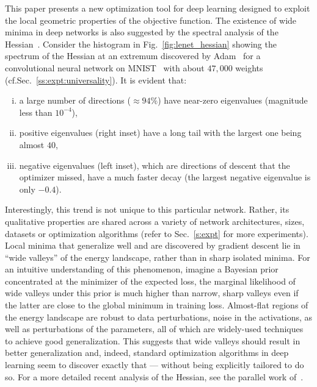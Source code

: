 \documentclass[10pt]{article}
\newcommand{\todo}[1]{{\color{gray}#1}\marginpar{\tiny\noindent{\raggedright{\color{blue}[TODO]}}}}
\begin{document}
This paper presents a new optimization tool for deep learning designed to exploit the local geometric properties of the objective function. \todo{The existence of wide minima in deep networks is also suggested by the spectral analysis of the Hessian~\citep{sagun2016singularity}.} Consider the histogram in Fig.~\ref{fig:lenet_hessian} showing the spectrum of the Hessian at an extremum discovered by Adam~\citep{kingma2014adam} for a convolutional neural network on MNIST~\citep{lecun1998gradient} with about $47,000$ weights (cf.\@ Sec.~\ref{ss:expt:universality}). It is evident that:
\begin{enumerate}[(i)]
\item a large number of directions ($\approx 94\%$) have near-zero eigenvalues (magnitude less than $10^{-4}$),
\item positive eigenvalues (right inset) have a long tail with the largest one being almost $40$,
\item negative eigenvalues (left inset), which are directions of descent that the optimizer missed, have a much faster decay (the largest negative eigenvalue is only $-0.4$).
\end{enumerate}
Interestingly, this trend is not unique to this particular network. Rather, its qualitative properties are shared across a variety of network architectures, sizes, datasets or optimization algorithms (refer to Sec.~\ref{s:expt} for more experiments). Local minima that generalize well and are discovered by gradient descent lie in ``wide valleys'' of the energy landscape, rather than in sharp isolated minima. For an intuitive understanding of this phenomenon, imagine a Bayesian prior concentrated at the minimizer of the expected loss, the marginal likelihood of wide valleys under this prior is much higher than narrow, sharp valleys even if the latter are close to the global minimum in training loss. Almost-flat regions of the energy landscape are robust to data perturbations, noise in the activations, as well as perturbations of the parameters, all of which are widely-used techniques to achieve good generalization. This suggests that wide valleys should result in better generalization and, indeed, standard optimization algorithms in deep learning seem to discover exactly that --- without being explicitly tailored to do so. \todo{For a more detailed recent
analysis of the Hessian, see the parallel work of~\citet{sagun2016singularity}.}
\end{document}
